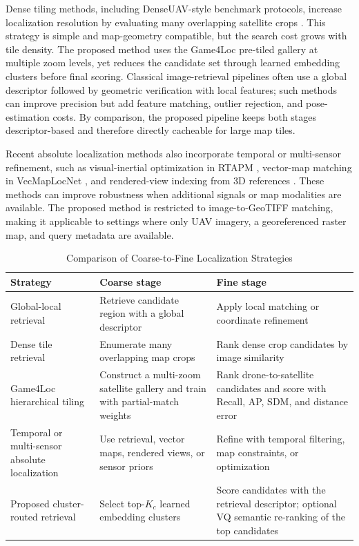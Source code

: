 \documentclass[conference]{IEEEtran}
\begin{document}
Dense tiling methods, including DenseUAV-style benchmark protocols, increase
localization resolution by evaluating many overlapping satellite crops
\cite{dai2024denseuav}. This strategy is simple and map-geometry compatible,
but the search cost grows with tile density. The proposed method uses the Game4Loc pre-tiled gallery at multiple zoom
levels, yet reduces the candidate set through learned embedding clusters
before final scoring. Classical image-retrieval pipelines
often use a global descriptor followed by geometric verification with local
features; such methods can improve precision but add feature matching,
outlier rejection, and pose-estimation costs. By comparison, the proposed
pipeline keeps both stages descriptor-based and therefore directly cacheable
for large map tiles.

Recent absolute localization methods also incorporate temporal or
multi-sensor refinement, such as visual-inertial optimization in RTAPM
\cite{tong2025rtapm}, vector-map matching in VecMapLocNet
\cite{hao2025vecmaploc}, and rendered-view indexing from 3D references
\cite{li2025viewpoint}. These methods can improve robustness when additional
signals or map modalities are available. The proposed method is restricted to
image-to-GeoTIFF matching, making it applicable to settings where only UAV
imagery, a georeferenced raster map, and query metadata are available.

\begin{table}[htbp]
\caption{Comparison of Coarse-to-Fine Localization Strategies}
\label{tab:coarse_fine_comparison}
\centering
\footnotesize
\setlength{\tabcolsep}{3pt}
\begin{tabular}{>{\raggedright\arraybackslash}p{}
                >{\raggedright\arraybackslash}p{}
                >{\raggedright\arraybackslash}p{}}
\toprule
Strategy & Coarse stage & Fine stage \\
\midrule
Global-local retrieval \cite{li2023glvl} &
Retrieve candidate region with a global descriptor &
Apply local matching or coordinate refinement \\
Dense tile retrieval \cite{dai2024denseuav} &
Enumerate many overlapping map crops &
Rank dense crop candidates by image similarity \\
Game4Loc hierarchical tiling \cite{ji2024game4loc} &
Construct a multi-zoom satellite gallery and train with partial-match weights &
Rank drone-to-satellite candidates and score with Recall, AP, SDM, and distance error \\
Temporal or multi-sensor absolute localization \cite{tong2025rtapm,hao2025vecmaploc,li2025viewpoint} &
Use retrieval, vector maps, rendered views, or sensor priors &
Refine with temporal filtering, map constraints, or optimization \\
Proposed cluster-routed retrieval &
Select top-$K_c$ learned embedding clusters &
Score candidates with the retrieval descriptor; optional VQ semantic re-ranking of the top candidates \\
\bottomrule
\end{tabular}
\end{table}
\end{document}
